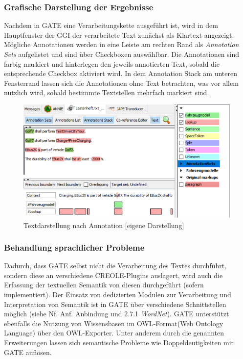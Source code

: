 \documentclass[12pt]{report}
\begin{document}
\subsubsection{Grafische Darstellung der Ergebnisse}
Nachdem in GATE eine Verarbeitungskette ausgeführt ist, wird in dem Hauptfenster der GGI der verarbeitete Text zunächst als Klartext angezeigt. Mögliche Annotationen werden in eine Leiste am rechten Rand als \textit{\glqq  Annotation Sets\grqq{}} aufgelistet und sind über Checkboxen auswählbar. Die Annotationen sind farbig markiert und hinterlegen den jeweils annotierten Text, sobald die entsprechende Checkbox aktiviert wird.
In dem Annotation Stack am unteren Fensterrand lassen sich die Annotationen ohne Text betrachten, was vor allem nützlich wird, sobald bestimmte Textstellen mehrfach markiert sind.\\

\begin{figure}
\begin{center}
\includegraphics[scale=0.8]{GATE_Bilder/GATE-MarkUp.png}
\caption{Textdarstellung nach Annotation [eigene Darstellung]}
\end{center}
\end{figure}


\subsubsection{Behandlung sprachlicher Probleme} 
Dadurch, dass GATE selbst nicht die Verarbeitung des Textes durchführt, sondern diese an verschiedene CREOLE-Plugins auslagert, wird auch die Erfassung der textuellen Semantik von diesen durchgeführt (sofern implementiert). Der Einsatz von dedizierten Modulen zur Verarbeitung und Interpretation von Semantik ist in GATE über verschiedene Schnittstellen möglich (siehe Nf. Anf. Anbindung und 2.7.1 \textit{WordNet}). GATE unterstützt ebenfalls die Nutzung von Wissensbasen im OWL-Format(Web Ontology Language) über den OWL-Exporter. Unter anderem durch die genannten Erweiterungen lassen sich semantische Probleme wie Doppeldeutigkeiten mit GATE auflösen.
\end{document}
